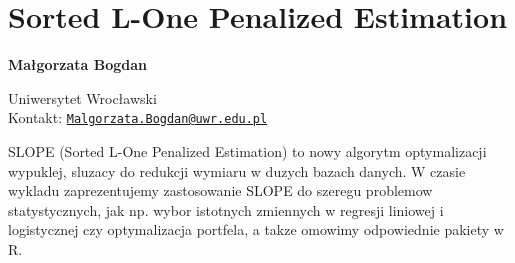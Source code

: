 \documentclass[\main/boa.tex]{subfiles}
\begin{document}
\section{Sorted L-One Penalized Estimation}


\begin{minipage}{0.915\textwidth}
	\centering
  {\bf \huge {} Małgorzata Bogdan}
\end{minipage}


\vskip 0.3cm

\begin{affiliations}
\begin{minipage}{0.915\textwidth}
\centering
\large Uniwersytet Wrocławski  \\[5pt]
Kontakt: \href{mailto:Malgorzata.Bogdan@uwr.edu.pl}{\nolinkurl{Malgorzata.Bogdan@uwr.edu.pl}}\\
\end{minipage}
\end{affiliations}

\vskip 0.8cm

SLOPE (Sorted L-One Penalized Estimation) to nowy algorytm optymalizacji wypuklej, sluzacy do redukcji wymiaru w duzych bazach danych. W czasie wykladu zaprezentujemy zastosowanie SLOPE do szeregu problemow statystycznych, jak np. wybor istotnych zmiennych w regresji liniowej i logistycznej czy optymalizacja portfela, a takze omowimy odpowiednie pakiety w R. 
\end{document}
